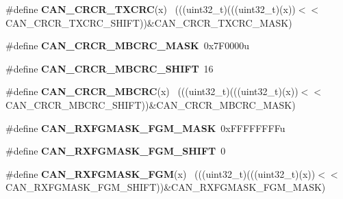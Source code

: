 \begin{DoxyCompactItemize}
\item 
\hypertarget{group___c_a_n___register___masks_ga0349217f6b6cb17e679907753cb1b580}{}\#define {\bfseries C\+A\+N\+\_\+\+C\+R\+C\+R\+\_\+\+T\+X\+C\+R\+C}(x)                                            ~(((uint32\+\_\+t)(((uint32\+\_\+t)(x))$<$$<$C\+A\+N\+\_\+\+C\+R\+C\+R\+\_\+\+T\+X\+C\+R\+C\+\_\+\+S\+H\+I\+F\+T))\&C\+A\+N\+\_\+\+C\+R\+C\+R\+\_\+\+T\+X\+C\+R\+C\+\_\+\+M\+A\+S\+K)\label{group___c_a_n___register___masks_ga0349217f6b6cb17e679907753cb1b580}

\item 
\hypertarget{group___c_a_n___register___masks_ga8b17ddaa608ead97f25b59e5919d079c}{}\#define {\bfseries C\+A\+N\+\_\+\+C\+R\+C\+R\+\_\+\+M\+B\+C\+R\+C\+\_\+\+M\+A\+S\+K}~0x7\+F0000u\label{group___c_a_n___register___masks_ga8b17ddaa608ead97f25b59e5919d079c}

\item 
\hypertarget{group___c_a_n___register___masks_ga1d18c789e52dbae45dc581a3327a1bde}{}\#define {\bfseries C\+A\+N\+\_\+\+C\+R\+C\+R\+\_\+\+M\+B\+C\+R\+C\+\_\+\+S\+H\+I\+F\+T}~16\label{group___c_a_n___register___masks_ga1d18c789e52dbae45dc581a3327a1bde}

\item 
\hypertarget{group___c_a_n___register___masks_gadf313688a0803a57a7daa1f21876c6c7}{}\#define {\bfseries C\+A\+N\+\_\+\+C\+R\+C\+R\+\_\+\+M\+B\+C\+R\+C}(x)                                            ~(((uint32\+\_\+t)(((uint32\+\_\+t)(x))$<$$<$C\+A\+N\+\_\+\+C\+R\+C\+R\+\_\+\+M\+B\+C\+R\+C\+\_\+\+S\+H\+I\+F\+T))\&C\+A\+N\+\_\+\+C\+R\+C\+R\+\_\+\+M\+B\+C\+R\+C\+\_\+\+M\+A\+S\+K)\label{group___c_a_n___register___masks_gadf313688a0803a57a7daa1f21876c6c7}

\item 
\hypertarget{group___c_a_n___register___masks_ga5db0253c73d24a846f3f3ce6cd67e74c}{}\#define {\bfseries C\+A\+N\+\_\+\+R\+X\+F\+G\+M\+A\+S\+K\+\_\+\+F\+G\+M\+\_\+\+M\+A\+S\+K}~0x\+F\+F\+F\+F\+F\+F\+F\+Fu\label{group___c_a_n___register___masks_ga5db0253c73d24a846f3f3ce6cd67e74c}

\item 
\hypertarget{group___c_a_n___register___masks_ga65e590b20d692e367f4ee9dc8a4585e2}{}\#define {\bfseries C\+A\+N\+\_\+\+R\+X\+F\+G\+M\+A\+S\+K\+\_\+\+F\+G\+M\+\_\+\+S\+H\+I\+F\+T}~0\label{group___c_a_n___register___masks_ga65e590b20d692e367f4ee9dc8a4585e2}

\item 
\hypertarget{group___c_a_n___register___masks_gab9f806f5a8e9cd528fe08688ef1794e5}{}\#define {\bfseries C\+A\+N\+\_\+\+R\+X\+F\+G\+M\+A\+S\+K\+\_\+\+F\+G\+M}(x)                                        ~(((uint32\+\_\+t)(((uint32\+\_\+t)(x))$<$$<$C\+A\+N\+\_\+\+R\+X\+F\+G\+M\+A\+S\+K\+\_\+\+F\+G\+M\+\_\+\+S\+H\+I\+F\+T))\&C\+A\+N\+\_\+\+R\+X\+F\+G\+M\+A\+S\+K\+\_\+\+F\+G\+M\+\_\+\+M\+A\+S\+K)\label{group___c_a_n___register___masks_gab9f806f5a8e9cd528fe08688ef1794e5}


\end{DoxyCompactItemize}
